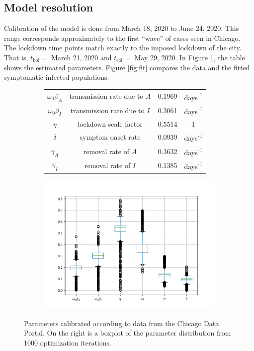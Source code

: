 \documentclass[11pt]{article}
\begin{document}
	\subsection{Model resolution}
		Calibration of the model is done from March 18, 2020 to June 24, 2020.
		This range corresponds approximately to the first ``wave'' of cases seen in Chicago.
		The lockdown time points match exactly to the imposed lockdown of the city.
		That is, $t_\mathrm{bol} =$ March 21, 2020 and $t_\mathrm{eol} =$ May 29, 2020.
		In Figure \ref{fig:params}, the table shows the estimated parameters.
		Figure \ref{fig:fit} compares the data and the fitted symptomatic infected populations.
		\begin{figure}[h!]
			\centering
			\begin{subfigure}{0.55\textwidth}
				\begin{tabular}{c c c c}
					\hline
					$\omega_0 \beta_A$ & transmission rate due to $A$ & 0.1969 & days\textsuperscript{-1} \\
					$\omega_0 \beta_I$ & transmission rate due to $I$ & 0.3061 & days\textsuperscript{-1} \\
					$\eta$ & lockdown scale factor & 0.5514 & 1 \\
					$\delta$ & symptom onset rate & 0.0939 & days\textsuperscript{-1} \\
					$\gamma_A$ & removal rate of $A$ & 0.3632 & days\textsuperscript{-1} \\
					$\gamma_I$ & removal rate of $I$ & 0.1385 & days\textsuperscript{-1} \\
					\hline
				\end{tabular}
			\end{subfigure}%
			\begin{subfigure}{0.45\textwidth}
				\includegraphics[width=\textwidth]{box-plot.pdf}
			\end{subfigure}
			\caption{Parameters calibrated according to data from the Chicago Data Portal.
				On the right is a boxplot of the parameter distribution from 1000 optimization iterations.}
			\label{fig:params}
		\end{figure}
	
\end{document}
